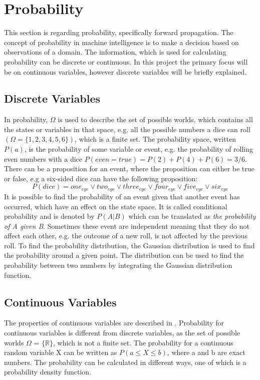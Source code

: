 \section{Probability}\label{section:probability}
This section is regarding probability, specifically forward propagation.
The concept of probability in machine intelligence is to make a decision based on observations of a domain.
The information, which is used for calculating probability can be discrete or continuous. 
In this project the primary focus will be on continuous variables, however discrete variables will be briefly explained.

\subsection{Discrete Variables}\label{subsection:discrete-variables}
In probability, $\Omega$ is used to describe the set of possible worlds, which contains all the states or variables in that space, e.g. all the possible numbers a dice can roll $(\Omega = \{1, 2, 3, 4, 5, 6\})$, which is a finite set.
The probability space, written $P(a)$, is the probability of some variable or event, e.g. the probability of rolling even numbers with a dice $P(even = true) = P(2) + P(4) + P(6) = 3/6$. 
There can be a proposition for an event, where the proposition can either be true or false, e.g a six-sided dice can have the following proposition:
$$P(dice) = one_{eye} \vee two_{eye} \vee three_{eye} \vee four_{eye} \vee five_{eye} \vee six_{eye}$$
It is possible to find the probability of an event given that another event has occurred, which have an effect on the state space.
It is called conditional probability and is denoted by $P(A|B)$ which can be translated as \textit{the probability of A given B}.
Sometimes these event are independent meaning that they do not affect each other, e.g. the outcome of a new roll, is not affected by the previous roll.
To find the probability distribution, the 
Gaussian distribution is used to find the probability around a given point.
The distribution can be used to find the probability between two numbers by integrating the Gaussian distribution function.

\subsection{Continuous Variables}\label{subsection:continuous-variables}
The properties of continuous variables are described in .
Probability for continuous variables is different from discrete variables, as the set of possible worlds $\Omega$ = $\{\mathbb{R}\}$, which is not a finite set. 
The probability for a continuous random variable X can be written as $P(a \leq X \leq b)$, where a and b are exact numbers.
The probability can be calculated in different ways, one of which is a probability density function.

